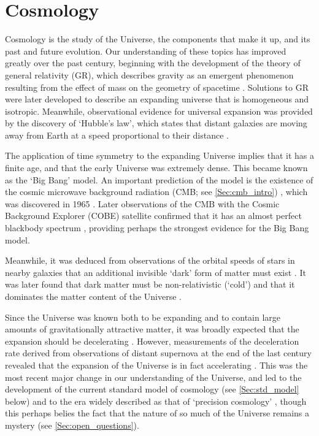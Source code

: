 \documentclass{scrbook}
\begin{document}

\chapter{Cosmology}

Cosmology is the study of the Universe, the components that make it up, and its past and future evolution. Our understanding of these topics has improved greatly over the past century, beginning with the development of the theory of general relativity (GR), which describes gravity as an emergent phenomenon resulting from the effect of mass on the geometry of spacetime \citep{Einstein1916}. Solutions to GR were later developed \citep{Friedmann1922, Friedmann1924, Lemaitre1927, Lemaitre1933, Robertson1935, Robertson1936a, Robertson1936b, Walker1937} to describe an expanding universe that is homogeneous and isotropic. Meanwhile, observational evidence for universal expansion was provided by the discovery of `Hubble's law', which states that distant galaxies are moving away from Earth at a speed proportional to their distance \citep{Lemaitre1927, Hubble1929}.

The application of time symmetry to the expanding Universe implies that it has a finite age, and that the early Universe was extremely dense. This became known as the `Big Bang' model. An important prediction of the model is the existence of the cosmic microwave background radiation (CMB; see \autoref{Sec:cmb_intro}) \citep{Gamow1948a, Gamow1948b, Alpher1948a, Alpher1948b}, which was discovered in 1965 \citep{Penzias1965, Dicke1965}. Later observations of the CMB with the Cosmic Background Explorer (COBE) satellite confirmed that it has an almost perfect blackbody spectrum \citep{Mather1990, Mather1994, Fixsen1996}, providing perhaps the strongest evidence for the Big Bang model.

Meanwhile, it was deduced from observations of the orbital speeds of stars in nearby galaxies that an additional invisible `dark' form of matter must exist \citep{Kapteyn1922, Zwicky1933, Zwicky1937, Rubin1970, Freeman1970, Bosma1978}. It was later found that dark matter must be non-relativistic (`cold') and that it dominates the matter content of the Universe \citep{Rubin1980, Bond1982, Blumenthal1982, Davis1985}.

Since the Universe was known both to be expanding and to contain large amounts of gravitationally attractive matter, it was broadly expected that the expansion should be decelerating \citep[e.g.][]{Yoshii1988, Gasperini1993}. However, measurements of the deceleration rate derived from observations of distant supernova at the end of the last century revealed that the expansion of the Universe is in fact accelerating \citep{Riess1998, Perlmutter1999}. This was the most recent major change in our understanding of the Universe, and led to the development of the current standard model of cosmology (see \autoref{Sec:std_model} below) and to the era widely described as that of `precision cosmology' \citep[e.g.][]{Steigman2007}, though this perhaps belies the fact that the nature of so much of the Universe remains a mystery (see \autoref{Sec:open_questions}).
\end{document}
